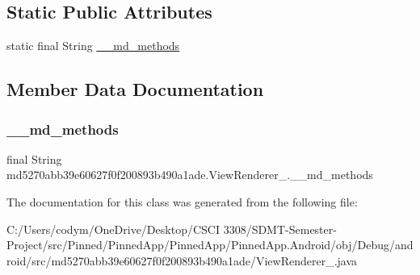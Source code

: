 \subsection*{Static Public Attributes}
\begin{DoxyCompactItemize}
\item 
static final String \hyperlink{classmd5270abb39e60627f0f200893b490a1ade_1_1_view_renderer__2_ac66b6f41d2afba0df6ae890c8f2b644b}{\+\_\+\+\_\+md\+\_\+methods}
\end{DoxyCompactItemize}


\subsection{Member Data Documentation}
\mbox{\label{classmd5270abb39e60627f0f200893b490a1ade_1_1_view_renderer__2_ac66b6f41d2afba0df6ae890c8f2b644b}} 
\subsubsection{\texorpdfstring{\+\_\+\+\_\+md\+\_\+methods}{\_\_md\_methods}}
{\footnotesize\ttfamily final String md5270abb39e60627f0f200893b490a1ade.\+View\+Renderer\+\_.\+\_\+\+\_\+md\+\_\+methods\hspace{0.3cm}{\ttfamily [static]}}



The documentation for this class was generated from the following file\+:\begin{DoxyCompactItemize}
\item 
C\+:/\+Users/codym/\+One\+Drive/\+Desktop/\+C\+S\+C\+I 3308/\+S\+D\+M\+T-\/\+Semester-\/\+Project/src/\+Pinned/\+Pinned\+App/\+Pinned\+App/\+Pinned\+App.\+Android/obj/\+Debug/android/src/md5270abb39e60627f0f200893b490a1ade/View\+Renderer\+\_.\+java\end{DoxyCompactItemize}

